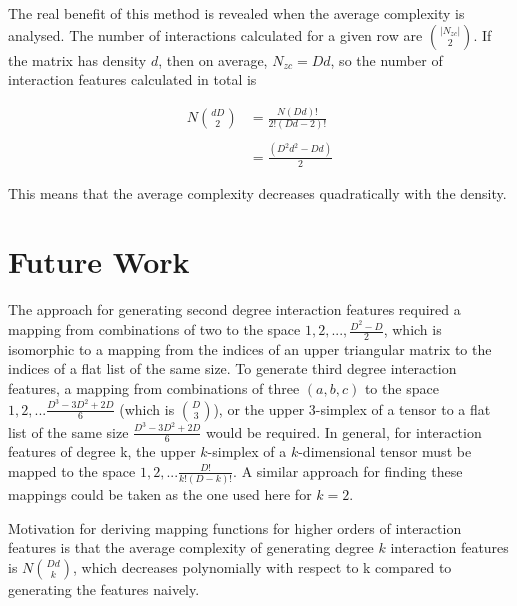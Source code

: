 \documentclass[twoside,11pt]{article}
\begin{document}
The real benefit of this method is revealed when the average complexity is analysed. The 
number of interactions calculated for a given row are $\binom{|N_{zc}|}{2}$. If the matrix has 
density $d$, then on average, $N_{zc} = D d$, so the number of interaction features 
calculated in total is 

\begin{align*}
N \binom{d D}{2} &= \frac{N (Dd)!}{2!(Dd-2)!}\\
    \\
    &= \frac{(D^2d^2-Dd)}{2}
\end{align*}

This means that the average complexity decreases quadratically with the density.

\section{Future Work}
The approach for generating second degree interaction features required a mapping from 
combinations of two to the space $1,2,...,\frac{D^2-D}{2}$, which is isomorphic to a mapping from 
the indices of an upper triangular matrix to the indices of a flat list of the same size. 
To generate third degree interaction features, a mapping from combinations of three 
$(a,b,c)$ to the space $1,2,...\frac{D^3-3D^2+2D}{6}$ (which is $\binom{D}{3}$), or the upper $3$-simplex of a tensor to a flat 
list of the same size $\frac{D^3-3D^2+2D}{6}$ would be required. In general, for interaction 
features of degree k, the upper $k$-simplex of a $k$-dimensional tensor must be mapped to the 
space $1,2,...\frac{D!}{k!(D-k)!}$. A similar approach for finding these mappings could be taken 
as the one used here for $k=2$. 

Motivation for deriving mapping functions for higher orders
of interaction features is that the average complexity of generating degree $k$ interaction
features is $N \binom{Dd}{k}$, which decreases polynomially with respect to k compared to
generating the features naively.

    
\vskip 0.2in

\end{document}
